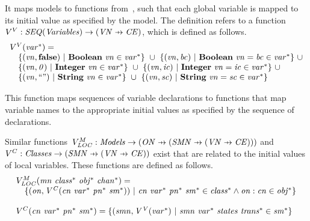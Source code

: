 \noindent
It maps models to functions from~\VGLOB, such that each global variable is mapped to its initial value as specified by the model.
The definition refers to a function~$V^V : \it{SEQ}(\Variables) \to (\VariableNames \pfun \ConstantExpressions)$, which is defined as follows.
%
\[
\begin{array}{l}
V^V(\it{var^*}) = \\
\quad \{(\it{vn}, \textbf{false}) ~ | ~ \textbf{Boolean}~\it{vn} \in \it{var^*} \} ~ \cup ~ \{(\it{vn}, \it{bc}) ~ | ~ \textbf{Boolean}~\it{vn}=\it{bc} \in \it{var^*} \}
\ \cup \\
\quad \{(\it{vn}, 0) ~ | ~ \textbf{Integer}~\it{vn} \in \it{var^*} \} ~ \cup ~ \{(\it{vn}, \it{ic}) ~ | ~ \textbf{Integer}~\it{vn}=\it{ic} \in \it{var^*} \}
\ \cup \\
\quad \{(\it{vn}, ``") ~ | ~ \textbf{String}~\it{vn} \in \it{var^*} \} ~ \cup ~ \{(\it{vn}, \it{sc}) ~ | ~ \textbf{String}~\it{vn}=\it{sc} \in \it{var^*} \}
\end{array}
\]

\noindent
This function maps sequences of variable declarations to functions that map variable names to the appropriate initial values as specified by the sequence of declarations.

Similar functions~$V^M_{\it{LOC}} : \Models \to (\ObjectNames \pfun (\StateMachineNames \pfun (\VariableNames \pfun \ConstantExpressions)))$ and~$V^C : \Classes \to (\StateMachineNames \pfun (\VariableNames \pfun \ConstantExpressions))$ exist that are related to the initial values of local variables.
These functions are defined as follows.
%
\[
\begin{array}{l}
V^M_{\it{LOC}}(\it{mn}~\it{class^*}~\it{obj^*}~\it{chan^*}) = \\
\quad \{(\it{on}, V^C(\it{cn}~\it{var^*}~\it{pn^*}~\it{sm^*})) ~ | ~ \it{cn}~\it{var^*}~\it{pn^*}~\it{sm^*} \in \it{class^*} \wedge \it{on}:\it{cn} \in \it{obj^*} \} \\
\\
V^C(\it{cn}~\it{var^*}~\it{pn^*}~\it{sm^*}) =
\{(\it{smn}, V^V(\it{var^*}) ~ | ~ \it{smn}~\it{var^*}~\it{states}~\it{trans^*} \in \it{sm^*} \} \\
\end{array}
\]

